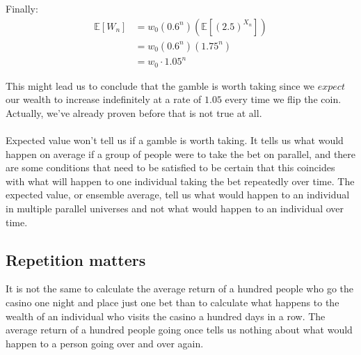 \documentclass[12pt]{article}
\begin{document}
Finally:
\begin{equation*}
  \begin{split}
    \mathbb{E}[W_n] &= w_0 \left(0.6^n\right) \left(\mathbb{E}[(2.5)^{X_n}]\right)\\
    &= w_0 \left(0.6^n\right) \left(1.75^n\right)\\
    &= w_0 \cdot 1.05^n
  \end{split}
\end{equation*}

This might lead us to conclude that the gamble is worth taking since we $expect$ our wealth to increase indefinitely at a rate of $1.05$ every time we flip the coin. Actually, we've already proven before that is not true at all.
\\\\
Expected value won't tell us if a gamble is worth taking. It tells us what would happen on average if a group of people were to take the bet on parallel, and there are some conditions that need to be satisfied to be certain that this coincides with what will happen to one individual taking the bet repeatedly over time. The expected value, or ensemble average, tell us what would happen to an individual in multiple parallel universes and not what would happen to an individual over time.

\subsection{Repetition matters}
It is not the same to calculate the average return of a hundred people who go the casino one night and place just one bet than to calculate what happens to the wealth of an individual who visits the casino a hundred days in a row. The average return of a hundred people going once tells us nothing about what would happen to a person going over and over again.
\end{document}
